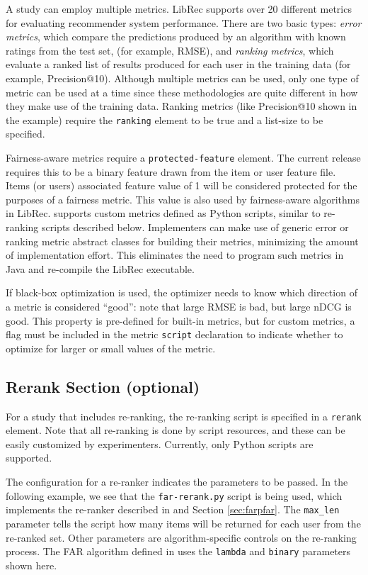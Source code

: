 A study can employ multiple metrics. LibRec supports over 20 different metrics for evaluating recommender system performance. There are two basic types: \textit{error metrics}, which compare the predictions produced by an algorithm with known ratings from the test set, (for example, RMSE), and \textit{ranking metrics}, which evaluate a ranked list of results produced for each user in the training data (for example, Precision@10). Although multiple metrics can be used, only one type of metric can be used at a time since these methodologies are quite different in how they make use of the training data. Ranking metrics (like Precision@10 shown in the example) require the \texttt{ranking} element to be true and a list-size to be specified.

Fairness-aware metrics require a \texttt{protected-feature} element. The current release requires this to be a binary feature drawn from the item or user feature file. Items (or users) associated feature value of 1 will be considered protected for the purposes of a fairness metric. This value is also used by fairness-aware algorithms in LibRec. \libauto{} supports custom metrics defined as Python scripts, similar to re-ranking scripts described below. Implementers can make use of generic error or ranking metric abstract classes for building their metrics, minimizing the amount of implementation effort. This eliminates the need to program such metrics in Java and re-compile the LibRec executable.

If black-box optimization is used, the optimizer needs to know which direction of a metric is considered ``good'': note that large RMSE is bad, but large nDCG is good. This property is pre-defined for built-in metrics, but for custom metrics, a flag must be included in the metric \texttt{script} declaration to indicate whether to optimize for larger or small values of the metric.  

\subsection{Rerank Section (optional)}
\label{subsec:re-ra}
For a study that includes re-ranking, the re-ranking script is specified in a \texttt{rerank} element. Note that all re-ranking is done by script resources, and these can be easily customized by experimenters. Currently, only Python scripts are supported.

The configuration for a re-ranker indicates the parameters to be passed. In the following example, we see that the \texttt{far-rerank.py} script is being used, which implements the re-ranker described in \cite{liu2019farpfar} and Section \ref{sec:farpfar}. The \texttt{max\_len} parameter tells the script how many items will be returned for each user from the re-ranked set. Other parameters are algorithm-specific controls on the re-ranking process. The FAR algorithm defined in \cite{liu2019farpfar} uses the \texttt{lambda} and \texttt{binary} parameters shown here.

